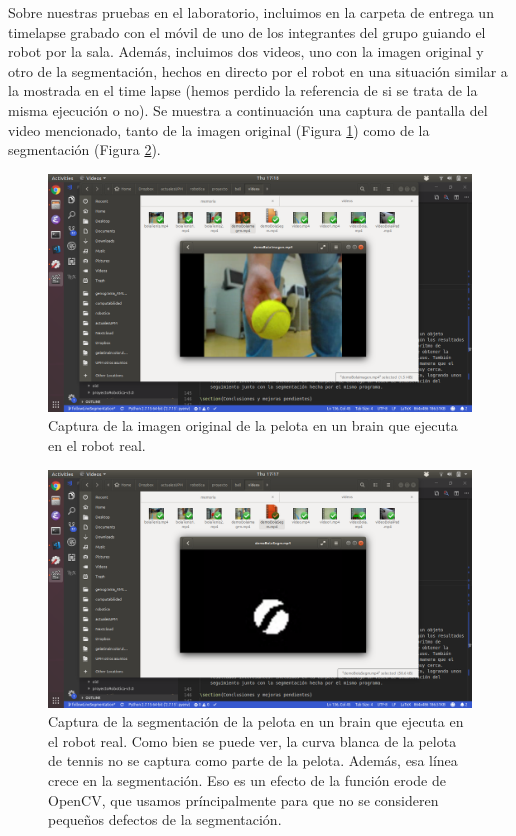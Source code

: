 \documentclass{article}
\begin{document}
	Sobre nuestras pruebas en el laboratorio, incluimos en la carpeta de entrega un timelapse grabado con el móvil de uno de los integrantes del grupo guiando el robot por la sala. Además, incluimos dos videos, uno con la imagen original y otro de la segmentación, hechos en directo por el robot en una situación similar a la mostrada en el time lapse (hemos perdido la referencia de si se trata de la misma ejecución o no). Se muestra a continuación una captura de pantalla del video mencionado, tanto de la imagen original (Figura \ref{fig:pelota1}) como de la segmentación (Figura \ref{fig:pelota2}).

	\begin{figure}[H]
	    \centering
	    \includegraphics[width=12cm]{./figures/pelota2.png}
	    \caption{Captura de la imagen original de la pelota en un brain que ejecuta en el robot real.}
	    \label{fig:pelota1}
	\end{figure}

	\begin{figure}[H]
	    \centering
	    \includegraphics[width=12cm]{./figures/pelota1.png}
	    \caption{Captura de la segmentación de la pelota en un brain que ejecuta en el robot real. Como bien se puede ver, la curva blanca de la pelota de tennis no se captura como parte de la pelota. Además, esa línea crece en la segmentación. Eso es un efecto de la función erode de OpenCV, que usamos príncipalmente para que no se consideren pequeños defectos de la segmentación.}
	    \label{fig:pelota2}
	\end{figure}
\end{document}
